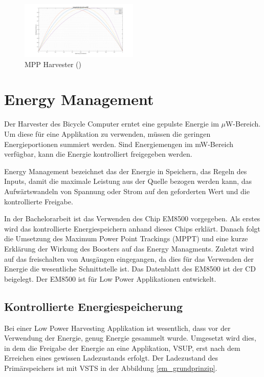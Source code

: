 \begin{figure}[ht]
   \includegraphics[width=0.5\textwidth]{2TheoretischeGrundlagen/imag/MPPharvesterTheorie.png}
   \caption{MPP Harvester (\cite{MPP_Harv})}
   \label{bild_harvester} 
\end{figure}


\section{Energy Management}\label{t_energy_management} 

Der Harvester des Bicycle Computer erntet eine gepulste Energie im $\mu$W-Bereich. Um diese für eine Applikation zu verwenden, müssen die geringen Energieportionen summiert werden. Sind Energiemengen im mW-Bereich verfügbar, kann die Energie kontrolliert freigegeben werden.

Energy Management bezeichnet das der Energie in Speichern, das Regeln des Inputs, damit die maximale Leistung aus der Quelle bezogen werden kann, das Aufwärtswandeln von Spannung oder Strom auf den geforderten Wert und die kontrollierte Freigabe.

In der Bachelorarbeit ist das Verwenden des Chip EM8500 vorgegeben. Als erstes wird das kontrollierte Energiespeichern anhand dieses Chips erklärt. Danach folgt die Umsetzung des Maximum Power Point Trackings (MPPT) und eine kurze Erklärung der Wirkung des Boosters auf das Energy Managments. Zuletzt wird auf das freischalten von Ausgängen eingegangen, da dies für das Verwenden der Energie die wesentliche Schnittstelle ist. Das Datenblatt des EM8500 ist der CD beigelegt. Der EM8500 ist für Low Power Applikationen entwickelt.

\subsection{Kontrollierte Energiespeicherung}

Bei einer Low Power Harvesting Applikation ist wesentlich, dass vor der Verwendung der Energie, genug Energie gesammelt wurde. Umgesetzt wird dies, in dem die Freigabe der Energie an eine Applikation, VSUP, erst nach dem Erreichen eines gewissen Ladezustands erfolgt. Der Ladezustand des Primärspeichers ist mit VSTS in der Abbildung \ref{em_grundprinzip}.

